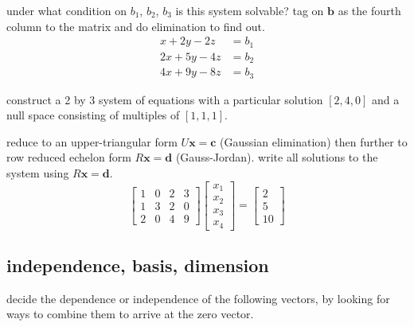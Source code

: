 \documentclass[addpoints]{exam}
\begin{document}
\begin{questions}
\question under what condition on $b_1$, $b_2$, $b_3$ is this system solvable?
tag on $\mathbf{b}$ as the fourth column to the matrix and do elimination to find out.
\begin{align*}
x+2y-2z&=b_1\\
2x+5y-4z&=b_2\\
4x+9y-8z&=b_3
\end{align*}

\question construct a 2 by 3 system of equations with a particular solution $[2,4,0]$ and a null space consisting of multiples of $[1,1,1]$.

\question reduce to an upper-triangular form $U\mathbf{x}=\mathbf{c}$ (Gaussian elimination) then further to row reduced echelon form $R\mathbf{x}=\mathbf{d}$ (Gauss-Jordan).
write all solutions to the system using  $R\mathbf{x}=\mathbf{d}$.
\begin{equation*}
        \begin{bmatrix} 1&0&2&3\\ 1&3&2&0 \\2&0&4&9 \end{bmatrix}
	\begin{bmatrix} x_1\\x_2\\x_3\\x_4 \end{bmatrix}=
	\begin{bmatrix} 2\\5\\10 \end{bmatrix}
\end{equation*}

\subsection*{independence, basis, dimension}

\question decide the dependence or independence of the following vectors, by looking for ways to combine them to arrive at the zero vector.
\begin{parts}
	\part $[1,3,2]$, $[2, 1, 3]$, $[3,2,1]$
	\part $[1,-3,2]$, $[2, 1, -3]$, $[-3,2,1]$
	\part $[1,0,0]$, $[1, 1, 0]$, $[1,1,1]$

\end{parts}
\end{questions}
\end{document}
